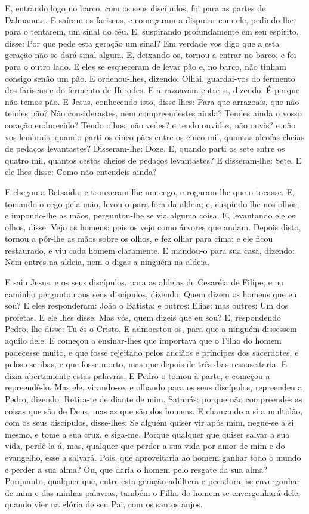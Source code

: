 E, entrando logo no barco, com os seus discípulos, foi para as
partes de Dalmanuta. E saíram os fariseus, e começaram a
disputar com ele, pedindo-lhe, para o tentarem, um sinal do céu.
E, suspirando profundamente em seu espírito, disse: Por que
pede esta geração um sinal? Em verdade vos digo que a esta geração
não se dará sinal algum. E, deixando-os, tornou a entrar no
barco, e foi para o outro lado. E eles se esqueceram de levar
pão e, no barco, não tinham consigo senão um pão. E
ordenou-lhes, dizendo: Olhai, guardai-vos do fermento dos fariseus e
do fermento de Herodes. E arrazoavam entre si, dizendo: É
porque não temos pão. E Jesus, conhecendo isto, disse-lhes:
Para que arrazoais, que não tendes pão? Não considerastes, nem
compreendestes ainda? Tendes ainda o vosso coração endurecido?
Tendo olhos, não vedes? e tendo ouvidos, não ouvis? e não vos
lembrais, quando parti os cinco pães entre os cinco mil,
quantas alcofas cheias de pedaços levantastes? Disseram-lhe: Doze.
E, quando parti os sete entre os quatro mil, quantos cestos
cheios de pedaços levantastes? E disseram-lhe: Sete. E ele
lhes disse: Como não entendeis ainda?

E chegou a Betsaida; e trouxeram-lhe um cego, e rogaram-lhe que o
tocasse. E, tomando o cego pela mão, levou-o para fora da
aldeia; e, cuspindo-lhe nos olhos, e impondo-lhe as mãos,
perguntou-lhe se via alguma coisa. E, levantando ele os
olhos, disse: Vejo os homens; pois os vejo como árvores que andam.
Depois disto, tornou a pôr-lhe as mãos sobre os olhos, e fez
olhar para cima: e ele ficou restaurado, e viu cada homem
claramente. E mandou-o para sua casa, dizendo: Nem entres na
aldeia, nem o digas a ninguém na aldeia.

E saiu Jesus, e os seus discípulos, para as aldeias de Cesaréia
de Filipe; e no caminho perguntou aos seus discípulos, dizendo: Quem
dizem os homens que eu sou? E eles responderam: João o
Batista; e outros: Elias; mas outros: Um dos profetas. E ele
lhes disse: Mas vós, quem dizeis que eu sou? E, respondendo Pedro,
lhe disse: Tu és o Cristo. E admoestou-os, para que a ninguém
dissessem aquilo dele. E começou a ensinar-lhes que importava
que o Filho do homem padecesse muito, e que fosse rejeitado pelos
anciãos e príncipes dos sacerdotes, e pelos escribas, e que fosse
morto, mas que depois de três dias ressuscitaria. E dizia
abertamente estas palavras. E Pedro o tomou à parte, e começou a
repreendê-lo. Mas ele, virando-se, e olhando para os seus
discípulos, repreendeu a Pedro, dizendo: Retira-te de diante de mim,
Satanás; porque não compreendes as coisas que são de Deus, mas as
que são dos homens. E chamando a si a multidão, com os seus
discípulos, disse-lhes: Se alguém quiser vir após mim, negue-se a si
mesmo, e tome a sua cruz, e siga-me. Porque qualquer que
quiser salvar a sua vida, perdê-la-á, mas, qualquer que perder a sua
vida por amor de mim e do evangelho, esse a salvará. Pois,
que aproveitaria ao homem ganhar todo o mundo e perder a sua alma?
Ou, que daria o homem pelo resgate da sua alma?
Porquanto, qualquer que, entre esta geração adúltera e
pecadora, se envergonhar de mim e das minhas palavras, também o
Filho do homem se envergonhará dele, quando vier na glória de seu
Pai, com os santos anjos.

